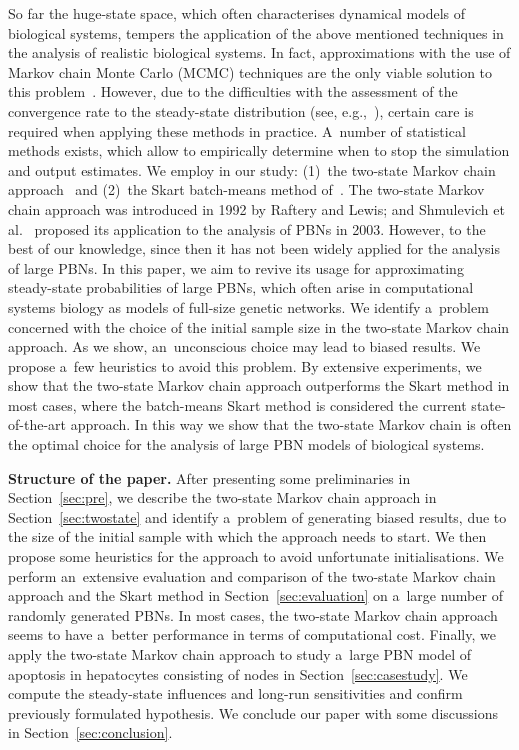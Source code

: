 \documentclass[runningheads,a4paper]{llncs}
\begin{document}
So far the huge-state space, which often characterises dynamical models of biological systems,
tempers the application of the above mentioned techniques in the analysis of realistic biological
systems. In fact, approximations with the use of Markov chain Monte Carlo (MCMC) techniques are
the only viable solution to this problem~\cite{SGHDZ03}. However, due to the difficulties with
the assessment of the convergence rate to the steady-state distribution (see, e.g.,~\cite{CC96}),
certain care is required when applying these methods in practice. A~number of statistical methods
exists, which allow to empirically determine when to stop the simulation and output estimates.
We employ in our study: (1)~the two-state Markov chain approach~\cite{RL92} and (2)~the Skart
batch-means method of~\cite{TWLS08}. The two-state Markov chain approach was introduced in 1992 by
Raftery and Lewis; and Shmulevich et al.~\cite{SGHDZ03} proposed its application to the analysis
of PBNs in 2003. However, to the best of our knowledge, since then it has not been widely applied
for the analysis of large PBNs. In this paper, we aim to revive its usage for approximating
steady-state probabilities of large PBNs, which often arise in computational systems biology as
models of full-size genetic networks. We identify a~problem concerned with the choice of the
initial sample size in the two-state Markov chain approach. As we show, an~unconscious choice may
lead to biased results. We propose a~few heuristics to avoid this problem. By extensive
experiments, we show that the two-state Markov chain approach outperforms the Skart method in most
cases, where the batch-means Skart method is considered the current state-of-the-art approach. In
this way we show that the two-state Markov chain is often the optimal choice for the analysis of
large PBN models of biological systems.

\medskip\noindent
{\bf Structure of the paper.}
After presenting some preliminaries in Section~\ref{sec:pre}, we describe the two-state Markov
chain approach in Section~\ref{sec:twostate} and identify a~problem of generating biased results,
due to the size of the initial sample with which the approach needs to start. We then propose some
heuristics for the approach to avoid unfortunate initialisations. We perform an~extensive
evaluation and comparison of the two-state Markov chain approach and the Skart method in
Section~\ref{sec:evaluation} on a~large number of randomly generated PBNs. In most cases, the
two-state Markov chain approach seems to have a~better performance in terms of computational cost.
Finally, we apply the two-state Markov chain approach to study a~large PBN model of apoptosis in
hepatocytes consisting of  nodes in Section~\ref{sec:casestudy}. We compute
the steady-state influences and long-run sensitivities and confirm previously formulated
hypothesis.
We conclude our paper with some discussions in Section~\ref{sec:conclusion}.
\end{document}
